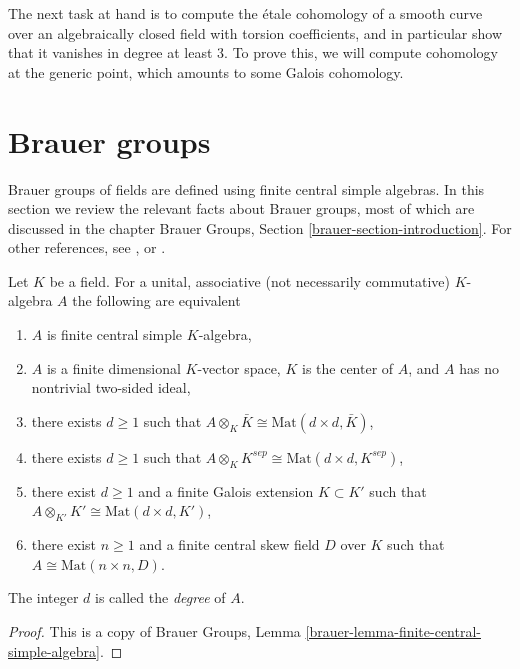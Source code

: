 \noindent
The next task at hand is to compute the \'etale cohomology of a smooth curve
over an algebraically closed field with torsion coefficients, and in
particular show that it vanishes in degree at least 3. To prove this, we
will compute cohomology at the generic point, which
amounts to some Galois cohomology.





\section{Brauer groups}
\label{section-brauer-groups}

\noindent
Brauer groups of fields are defined using finite central simple algebras.
In this section we review the relevant facts about Brauer groups, most of
which are discussed in the chapter
Brauer Groups, Section \ref{brauer-section-introduction}.
For other references, see \cite{SerreCorpsLocaux},
\cite{SerreGaloisCohomology} or \cite{Weil}.

\begin{theorem}
\label{theorem-central-simple-algebra}
Let $K$ be a field. For a unital, associative (not necessarily commutative)
$K$-algebra $A$ the following are equivalent
\begin{enumerate}
\item $A$ is finite central simple $K$-algebra,
\item $A$ is a finite dimensional $K$-vector space, $K$ is the center of $A$,
and $A$ has no nontrivial two-sided ideal,
\item there exists $d \geq 1$ such that
$A \otimes_K \bar K \cong \text{Mat}(d \times d, \bar K)$,
\item there exists $d \geq 1$ such that
$A \otimes_K K^{sep} \cong \text{Mat}(d \times d, K^{sep})$,
\item there exist $d \geq 1$ and a finite Galois extension $K \subset K'$
such that
$A \otimes_{K'} K' \cong \text{Mat}(d \times d, K')$,
\item there exist $n \geq 1$ and a finite central skew field $D$
over $K$ such that $A \cong \text{Mat}(n \times n, D)$.
\end{enumerate}
The integer $d$ is called the {\it degree} of $A$.
\end{theorem}

\begin{proof}
This is a copy of
Brauer Groups, Lemma \ref{brauer-lemma-finite-central-simple-algebra}.
\end{proof}

